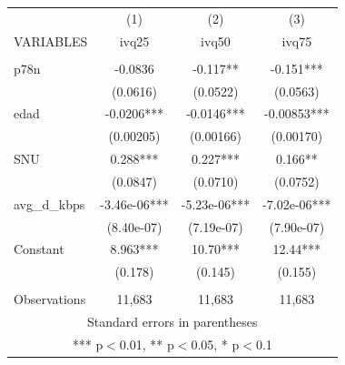 \documentclass[]{article}
\begin{document}
\begin{tabular}{lccc} \hline
 & (1) & (2) & (3) \\
VARIABLES & ivq25 & ivq50 & ivq75 \\ \hline
 &  &  &  \\
p78n & -0.0836 & -0.117** & -0.151*** \\
 & (0.0616) & (0.0522) & (0.0563) \\
edad & -0.0206*** & -0.0146*** & -0.00853*** \\
 & (0.00205) & (0.00166) & (0.00170) \\
SNU & 0.288*** & 0.227*** & 0.166** \\
 & (0.0847) & (0.0710) & (0.0752) \\
avg\_d\_kbps & -3.46e-06*** & -5.23e-06*** & -7.02e-06*** \\
 & (8.40e-07) & (7.19e-07) & (7.90e-07) \\
Constant & 8.963*** & 10.70*** & 12.44*** \\
 & (0.178) & (0.145) & (0.155) \\
 &  &  &  \\
 Observations & 11,683 & 11,683 & 11,683 \\ \hline
\multicolumn{4}{c}{ Standard errors in parentheses} \\
\multicolumn{4}{c}{ *** p$<$0.01, ** p$<$0.05, * p$<$0.1} \\
\end{tabular}
\end{document}
